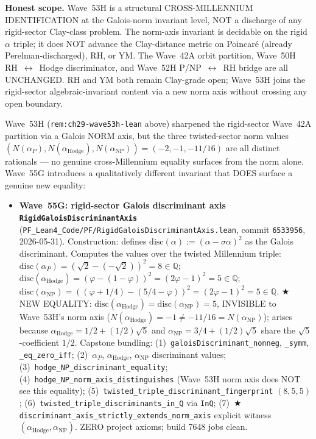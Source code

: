 \begin{remark}
\textbf{Honest scope.} Wave~53H is a structural CROSS-MILLENNIUM IDENTIFICATION at the Galois-norm invariant level, NOT a discharge of any rigid-sector Clay-class problem. The norm-axis invariant is decidable on the rigid $\alpha$ triple; it does NOT advance the Clay-distance metric on Poincar\'e (already Perelman-discharged), RH, or YM. The Wave~42A orbit partition, Wave~50H RH~$\leftrightarrow$~Hodge discriminator, and Wave~52H P/NP~$\leftrightarrow$~RH bridge are all UNCHANGED. RH and YM both remain Clay-grade open; Wave~53H joins the rigid-sector algebraic-invariant content via a new norm axis without crossing any open boundary.
\end{remark}

\begin{remark}[Wave~55G update: \texttt{RigidGaloisDiscriminantAxis} --- FIFTH rigid-norm axis (Galois discriminant) surfaces NEW Hodge~$\leftrightarrow$~NP equality $\mathrm{disc} = 5$ INVISIBLE to the Wave~53H norm axis, 2026-05-31]\label{rem:ch29-wave55g-lean}
Wave~53H (\texttt{rem:ch29-wave53h-lean} above) sharpened the rigid-sector Wave~42A partition via a Galois NORM axis, but the three twisted-sector norm values $(N(\alpha_P), N(\alpha_{\mathrm{Hodge}}), N(\alpha_{\mathrm{NP}})) = (-2, -1, -11/16)$ are all distinct rationals --- no genuine cross-Millennium equality surfaces from the norm alone. Wave~55G introduces a qualitatively different invariant that DOES surface a genuine new equality:
\begin{itemize}
  \item \textbf{Wave~55G: rigid-sector Galois discriminant axis \texttt{RigidGaloisDiscriminantAxis}} (\texttt{PF\_Lean4\_Code/PF/RigidGaloisDiscriminantAxis.lean}, commit \texttt{6533956}, 2026-05-31). Construction: defines $\mathrm{disc}(\alpha) := (\alpha - \sigma \alpha)^2$ as the Galois discriminant. Computes the values over the twisted Millennium triple: $\mathrm{disc}(\alpha_P) = (\sqrt{2} - (-\sqrt{2}))^2 = 8 \in \mathbb{Q}$; $\mathrm{disc}(\alpha_{\mathrm{Hodge}}) = (\varphi - (1 - \varphi))^2 = (2\varphi - 1)^2 = 5 \in \mathbb{Q}$; $\mathrm{disc}(\alpha_{\mathrm{NP}}) = ((\varphi + 1/4) - (5/4 - \varphi))^2 = (2\varphi - 1)^2 = 5 \in \mathbb{Q}$. ★ NEW EQUALITY: $\mathrm{disc}(\alpha_{\mathrm{Hodge}}) = \mathrm{disc}(\alpha_{\mathrm{NP}}) = 5$, INVISIBLE to Wave~53H's norm axis ($N(\alpha_{\mathrm{Hodge}}) = -1 \neq -11/16 = N(\alpha_{\mathrm{NP}})$); arises because $\alpha_{\mathrm{Hodge}} = 1/2 + (1/2)\sqrt{5}$ and $\alpha_{\mathrm{NP}} = 3/4 + (1/2)\sqrt{5}$ share the $\sqrt{5}$-coefficient $1/2$. Capstone bundling: (1)~\texttt{galoisDiscriminant\_nonneg}, \texttt{\_symm}, \texttt{\_eq\_zero\_iff}; (2)~$\alpha_P$, $\alpha_{\mathrm{Hodge}}$, $\alpha_{\mathrm{NP}}$ discriminant values; (3)~\texttt{hodge\_NP\_discriminant\_equality}; (4)~\texttt{hodge\_NP\_norm\_axis\_distinguishes} (Wave~53H norm axis does NOT see this equality); (5)~\texttt{twisted\_triple\_discriminant\_fingerprint} $(8, 5, 5)$; (6)~\texttt{twisted\_triple\_discriminants\_in\_Q} via \texttt{InQ}; (7)~★ \texttt{discriminant\_axis\_strictly\_extends\_norm\_axis} explicit witness $(\alpha_{\mathrm{Hodge}}, \alpha_{\mathrm{NP}})$. ZERO project axioms; build 7648 jobs clean.

\end{itemize}
\end{remark}
